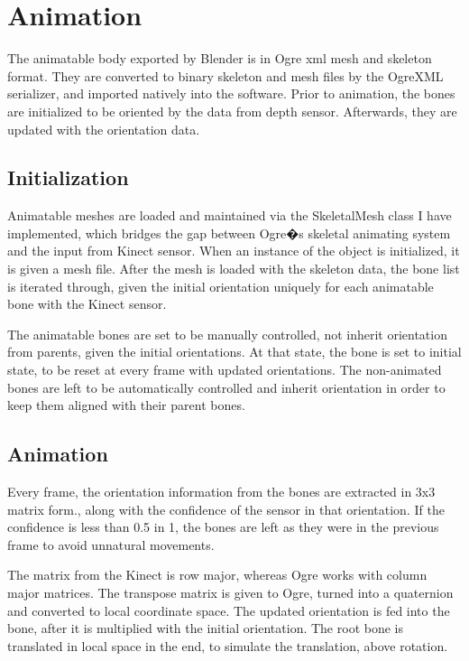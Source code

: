 \chapter{Animation}
\label{chapter_animation}

The animatable body exported by Blender is in Ogre xml mesh and skeleton format. They are converted to binary skeleton and mesh files by the OgreXML serializer, and imported natively into the software. Prior to animation, the bones are initialized to be oriented by the data from depth sensor. Afterwards, they are updated with the orientation data.

\section{Initialization}
\label{section_animation_initialization}

Animatable meshes are loaded and maintained via the SkeletalMesh class I have implemented, which bridges the gap between Ogre�s skeletal animating system and the input from Kinect sensor. When an instance of the object is initialized, it is given a mesh file. After the mesh is loaded with the skeleton data, the bone list is iterated through, given the initial orientation uniquely for each animatable bone with the Kinect sensor. 

The animatable bones are set to be manually controlled, not inherit orientation from parents, given the initial orientations. At that state, the bone is set to initial state, to be reset at every frame with updated orientations. The non-animated bones are left to be automatically controlled and inherit orientation in order to keep them aligned with their parent bones. 

\section{Animation}
\label{section_animation}
Every frame, the orientation information from the bones are extracted in 3x3 matrix form., along with the confidence of the sensor in that orientation. If the confidence is less than 0.5 in 1, the bones are left as they were in the previous frame to avoid unnatural movements. 

The matrix from the Kinect is row major, whereas Ogre works with column major matrices. The transpose matrix is given to Ogre, turned into a quaternion and converted to local coordinate space. The updated orientation is fed into the bone, after it is multiplied with the initial orientation. The root bone is translated in local space in the end, to simulate the translation, above rotation.

